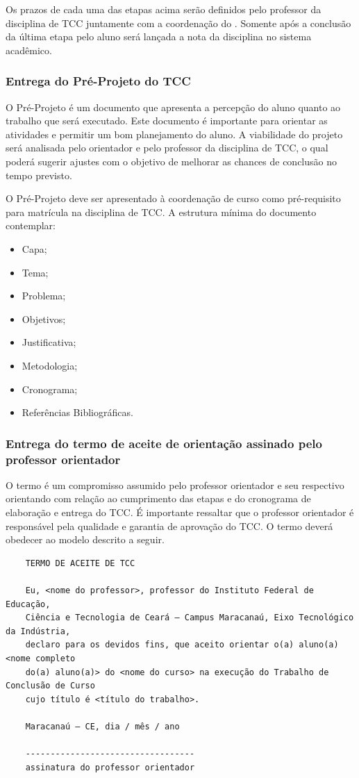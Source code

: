 Os prazos de cada uma das etapas acima serão definidos pelo professor da disciplina de TCC juntamente com a coordenação
do \NOMECURSO. Somente após a conclusão da última etapa pelo aluno será lançada a nota da disciplina no sistema acadêmico.

\subsubsection{Entrega do Pré-Projeto do TCC}

O Pré-Projeto é um documento que apresenta a percepção do aluno quanto ao trabalho que será executado. Este documento é importante para orientar as atividades e permitir um bom planejamento do aluno. A viabilidade do projeto será analisada pelo orientador e pelo professor da disciplina de TCC, o qual poderá sugerir ajustes com o objetivo de melhorar as chances de conclusão no tempo previsto.

O Pré-Projeto deve ser apresentado à coordenação de curso como pré-requisito para matrícula na disciplina de TCC. A estrutura mínima do documento contemplar:

\begin{itemize}
	\item Capa;
	\item Tema;
	\item Problema;
	\item Objetivos;
	\item Justificativa;
	\item Metodologia;
	\item Cronograma;
	\item Referências Bibliográficas.
\end{itemize}

\subsubsection{Entrega do termo de aceite de orientação assinado pelo professor orientador}

O termo é um compromisso assumido pelo professor orientador e seu respectivo orientando com relação ao cumprimento das
etapas e do cronograma de elaboração e entrega do TCC. É importante ressaltar que o professor orientador é responsável
pela qualidade e garantia de aprovação do TCC. O termo deverá obedecer ao modelo descrito a seguir.

\begin{verbatim}
	TERMO DE ACEITE DE TCC
	
	Eu, <nome do professor>, professor do Instituto Federal de Educação,
	Ciência e Tecnologia de Ceará – Campus Maracanaú, Eixo Tecnológico da Indústria,
	declaro para os devidos fins, que aceito orientar o(a) aluno(a) <nome completo
	do(a) aluno(a)> do <nome do curso> na execução do Trabalho de Conclusão de Curso
	cujo título é <título do trabalho>.
	
	Maracanaú – CE, dia / mês / ano
	
	----------------------------------
	assinatura do professor orientador
	
\end{verbatim}

